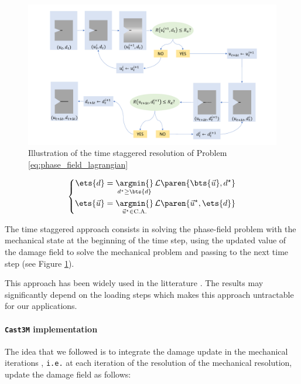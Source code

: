 \begin{figure}[H]
  \centering
  \includegraphics[width=10.cm]{../chapter_00_introduction/figures/time-staggered-resolution.pdf}
  \caption{Illustration of the time staggered resolution of Problem \eqref{eq:phase_field_lagrangian}}
  \label{fig:hho:phase_field:time_staggered_scheme}
\end{figure}

\[
\left\{
\begin{aligned}
  \ets{d}       &= \underset{d^{\star}\geq\bts{d}}{\argmin{}}\, \mathcal{L}\paren{\bts{\vec{u}},d^{\star}}\\
  \ets{\vec{u}} &= \underset{\vec{u}^{\star}\in\text{C.A.}}{\argmin{}}\, \mathcal{L}\paren{\vec{u}^{\star},\ets{d}}
\end{aligned}
\right.
\]

The time staggered approach consists in solving the phase-field problem
with the mechanical state at the beginning of the time step, using the
updated value of the damage field to solve the mechanical problem and
passing to the next time step (see Figure
\ref{fig:hho:phase_field:time_staggered_scheme}).

This approach has been widely used in the litterature
\cite{miehe_phase_2010, nguyen_phase_2015, nguyen_phase-field_2016, molnar_2d_2017, molnar_open-source_2020}.
The results may significantly depend on the loading steps which makes
this approach untractable for our applications.

\paragraph{\texttt{Cast3M} implementation}
\label{sec:phase_field:castem_implementation}

The idea that we followed is to integrate the damage update in the
mechanical iterations \cite{helfer_modelisation_2017}, \texttt{i.e.} at each
iteration of the resolution of the mechanical resolution, update the
damage field as follows:


